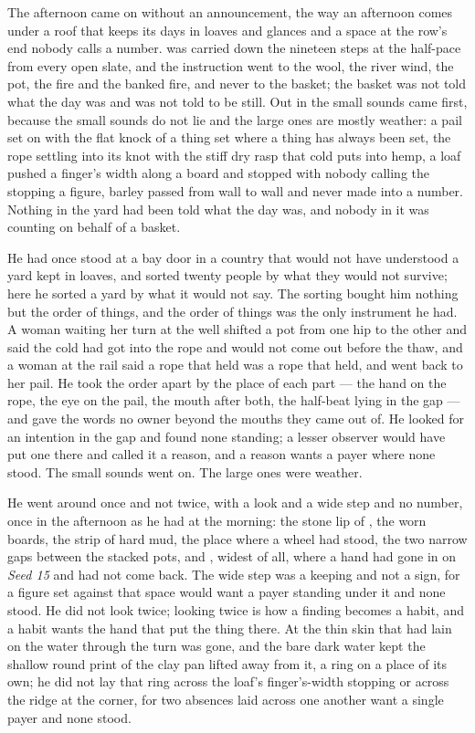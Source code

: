 The afternoon came on without an announcement, the way an afternoon comes under a roof that keeps its days in loaves and glances and a space at the row's end nobody calls a number.  was carried down the nineteen steps at the half-pace from every open slate, and the instruction went to the wool, the river wind, the pot, the fire and the banked fire, and never to the basket; the basket was not told what the day was and was not told to be still. Out in  the small sounds came first, because the small sounds do not lie and the large ones are mostly weather: a pail set on  with the flat knock of a thing set where a thing has always been set, the rope settling into its knot with the stiff dry rasp that cold puts into hemp, a loaf pushed a finger's width along a board and stopped with nobody calling the stopping a figure, barley passed from wall to wall and never made into a number. Nothing in the yard had been told what the day was, and nobody in it was counting on behalf of a basket.

He had once stood at a bay door in a country that would not have understood a yard kept in loaves, and sorted twenty people by what they would not survive; here he sorted a yard by what it would not say. The sorting bought him nothing but the order of things, and the order of things was the only instrument he had. A woman waiting her turn at the well shifted a pot from one hip to the other and said the cold had got into the rope and would not come out before the thaw, and a woman at the rail said a rope that held was a rope that held, and went back to her pail. He took the order apart by the place of each part --- the hand on the rope, the eye on the pail, the mouth after both, the half-beat lying in the gap --- and gave the words no owner beyond the mouths they came out of. He looked for an intention in the gap and found none standing; a lesser observer would have put one there and called it a reason, and a reason wants a payer where none stood. The small sounds went on. The large ones were weather.

He went around  once and not twice, with a look and a wide step and no number, once in the afternoon as he had at the morning: the stone lip of , the worn boards, the strip of hard mud, the place where a wheel had stood, the two narrow gaps between the stacked pots, and , widest of all, where a hand had gone in on \emph{Seed 15} and had not come back. The wide step was a keeping and not a sign, for a figure set against that space would want a payer standing under it and none stood. He did not look twice; looking twice is how a finding becomes a habit, and a habit wants the hand that put the thing there. At  the thin skin that had lain on the water through the turn was gone, and the bare dark water kept the shallow round print of the clay pan lifted away from it, a ring on a place of its own; he did not lay that ring across the loaf's finger's-width stopping or across the ridge at the corner, for two absences laid across one another want a single payer and none stood.

